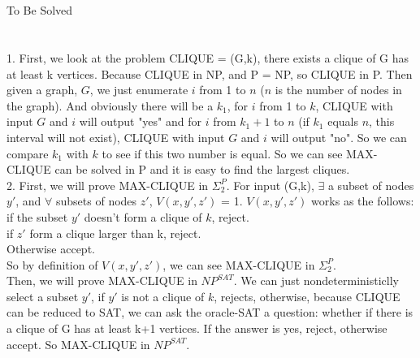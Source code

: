 \documentclass[11pt]{article}
\begin{document}
\part{}
    To Be Solved
\part{}
    1. First, we look at the problem CLIQUE = {(G,k), there exists a clique of G has at least k vertices}. Because CLIQUE in NP, and P = NP, so CLIQUE in P. Then given a graph, $G$, we just enumerate $i$ from 1 to $n$ ($n$ is the number of nodes in the graph). And obviously there will be a $k_{1}$, for $i$ from 1 to $k$, CLIQUE with input $G$ and $i$ will output "yes" and for $i$ from $k_{1}+1$ to $n$ (if $k_{1}$ equals $n$, this interval will not exist), CLIQUE with input $G$ and $i$ will output "no". So we can compare $k_{1}$ with $k$ to see if this two number is equal. So we can see MAX-CLIQUE can be solved in P and it is easy to find the largest cliques. \\
    2. First, we will prove MAX-CLIQUE in $\Sigma_{2}^{P}$. 
        For input (G,k), $\exists$ a subset of nodes $y'$, and $\forall$ subsets of nodes $z'$, $V(x, y',z')$ = 1.
        $V(x, y',z')$ works as the follows: \\
        if the subset $y'$ doesn't form a clique of $k$, reject. \\
        if $z'$ form a clique larger than k, reject. \\
        Otherwise accept.\\
        So by definition of $V(x, y',z')$, we can see MAX-CLIQUE in $\Sigma_{2}^{P}$. \\
        Then, we will prove MAX-CLIQUE in $NP^{SAT}$. We can just nondeterministiclly select a subset $y'$, if $y'$ is not a clique of $k$, rejects, otherwise, because CLIQUE can be reduced to SAT, we can ask the oracle-SAT a question: whether if there is a clique of G has at least k+1 vertices. If the answer is yes, reject, otherwise accept. So MAX-CLIQUE in $NP^{SAT}$.
\part{}
    
\end{document}
